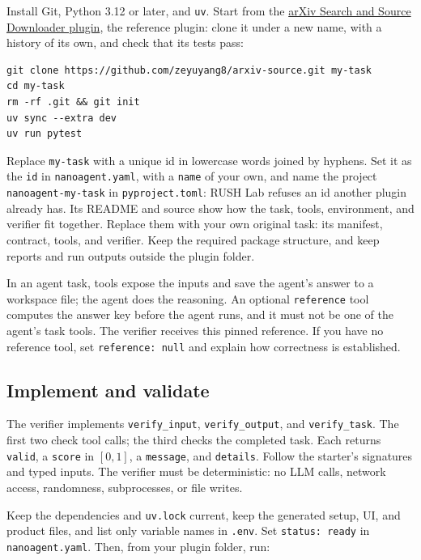 \documentclass{article}
\begin{document}
Install Git, Python 3.12 or later, and \texttt{uv}. Start from the
\href{https://github.com/zeyuyang8/arxiv-source}{arXiv Search and Source
Downloader plugin}, the reference plugin: clone it under a new name, with a
history of its own, and check that its tests pass:

\begin{lstlisting}
git clone https://github.com/zeyuyang8/arxiv-source.git my-task
cd my-task
rm -rf .git && git init
uv sync --extra dev
uv run pytest
\end{lstlisting}

\noindent
Replace \texttt{my-task} with a unique id in lowercase words joined by
hyphens. Set it as the \texttt{id} in \texttt{nanoagent.yaml}, with a
\texttt{name} of your own, and name the project \texttt{nanoagent-my-task} in
\texttt{pyproject.toml}: RUSH Lab refuses an id another plugin already has.
Its README and source show how the task, tools, environment, and verifier fit
together. Replace them with your own original task: its manifest, contract,
tools, and verifier. Keep the required package structure, and keep reports and
run outputs outside the plugin folder.

\medskip
\noindent
In an agent task, tools expose the inputs and save the agent's answer to a
workspace file; the agent does the reasoning. An optional \texttt{reference}
tool computes the answer key before the agent runs, and it must not be one of
the agent's task tools. The verifier receives this pinned reference. If you
have no reference tool, set \texttt{reference: null} and explain how
correctness is established.

\subsection{Implement and validate}

The verifier implements \texttt{verify\_input}, \texttt{verify\_output}, and
\texttt{verify\_task}. The first two check tool calls; the third checks the
completed task. Each returns \texttt{valid}, a \texttt{score} in $[0,1]$, a
\texttt{message}, and \texttt{details}. Follow the starter's signatures and
typed inputs. The verifier must be deterministic: no LLM calls, network
access, randomness, subprocesses, or file writes.

\medskip
\noindent
Keep the dependencies and \texttt{uv.lock} current, keep the generated
setup, UI, and product files, and list only variable names in \texttt{.env}.
Set \texttt{status: ready} in \texttt{nanoagent.yaml}. Then, from your plugin
folder, run:
\end{document}
